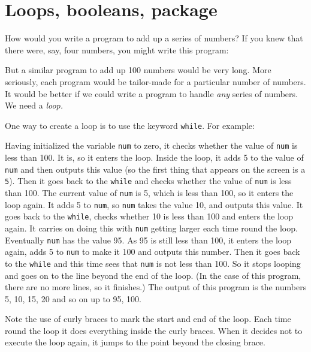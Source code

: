 \section{Loops, booleans, package}

How would you write a program to add up a series of numbers?
If you knew that there were, say, four numbers, you might write
this program:


But a similar program to add up 100 numbers would be very long.
More seriously, each program would be tailor-made for a particular
number of numbers.  It would be better if we could write a program
to handle \emph{any} series of numbers.  We need a \emph{loop.}

One way to create a loop is to use the keyword \texttt{while}.
For example:


Having initialized the variable \texttt{num} to zero, it checks
whether the value of \texttt{num} is less than 100.  It is, so it
enters the loop.  Inside the loop, it adds 5 to the value of
\texttt{num} and then outputs this value (so the first thing that
appears on the screen is a \texttt{5}).  Then it goes back to the
  \texttt{while} and checks whether the value of \texttt{num} is less than
100.  The current value of \texttt{num} is 5, which is less than 100,
so it enters the loop again.  It adds 5 to \texttt{num}, so
\texttt{num} takes the value 10, and outputs this value.  It goes back
to the \texttt{while}, checks whether 10 is less than 100 and enters
the loop again.  It carries on doing this with \texttt{num} getting
larger each time round the loop.  Eventually \texttt{num} has the
value 95. As 95 is still less than 100, it enters the loop again, adds 5 to
\texttt{num} to make it 100 and outputs this number.  Then it goes
back to the \texttt{while} and this time sees that \texttt{num} is not
less than 100.  So it stops looping and goes on to the line beyond the
end of the loop.  (In the case of this program, there are no more
lines, so it finishes.)  The output of this program is the numbers 5,
10, 15, 20 and so on up to 95, 100.

Note the use of curly braces to mark the start and end of the loop.
Each time round the loop it does everything inside the curly braces.
When it decides not to execute the loop again, it jumps to the point
beyond the closing brace.

